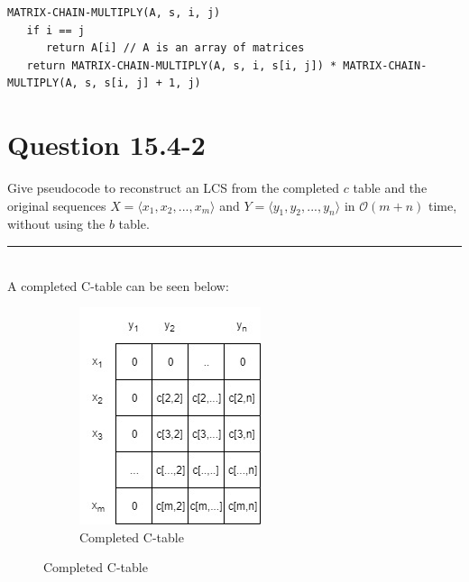 \documentclass[20pt]{article} %
\begin{document}
\begin{verbatim}
MATRIX-CHAIN-MULTIPLY(A, s, i, j)
   if i == j
      return A[i] // A is an array of matrices
   return MATRIX-CHAIN-MULTIPLY(A, s, i, s[i, j]) * MATRIX-CHAIN-MULTIPLY(A, s, s[i, j] + 1, j)
\end{verbatim}

\newpage
\section{Question 15.4-2} 
Give pseudocode to reconstruct an LCS from the completed $c$ table and the original sequences $X = \langle x_1, x_2, ..., x_m \rangle$ and $Y = \langle y_1, y_2, ..., y_n \rangle$ in $\mathcal{O}(m + n)$ time, without using the $b$ table. \\ 
\noindent\rule{2cm}{0.4pt} \\

A completed C-table can be seen below:

\begin{figure}[!htbp]
  	\centering
   	\begin{subfigure}[p]{0.4\linewidth}
    	\includegraphics[width=\linewidth]{ctable.jpg}
     	\caption{Completed C-table}
   	\end{subfigure}
\end{figure} 
\end{document}
